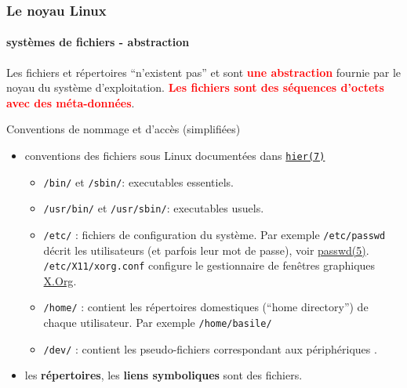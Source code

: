 \documentclass[xcolor=svgnames,final,smaller,a4]{beamer}
\begin{document}
\begin{frame}
  \frametitle{Le noyau Linux}
  \framesubtitle{systèmes de fichiers - abstraction}


  Les fichiers et répertoires ``n'existent pas'' et sont  \textbf{\textcolor{red}{une abstraction}} fournie par le noyau du système d'exploitation. \textbf{\textcolor{red}{Les fichiers sont des séquences d'octets}} {} \textbf{\textcolor{red}{avec des méta-données}}.

  Conventions de nommage et d'accès (simplifiées)

  \begin{itemize}

  \item conventions des fichiers sous Linux documentées dans \href{https://man7.org/linux/man-pages/man7/hier.7.html}{\texttt{hier(7)}} \begin{itemize}
  \item \texttt{/bin/} et \texttt{/sbin/}: executables essentiels.
  \item \texttt{/usr/bin/} et \texttt{/usr/sbin/}: executables usuels.
    \item \texttt{/etc/} : fichiers de configuration du système. Par
      exemple \texttt{/etc/passwd} décrit les utilisateurs (et parfois
      leur mot de passe), voir
      \href{https://man7.org/linux/man-pages/man5/passwd.5.html}{passwd(5)}. \texttt{/etc/X11/xorg.conf}
      configure le gestionnaire de fenêtres graphiques
      \href{https://fr.wikipedia.org/wiki/X.Org}{X.Org}.
      \item \texttt{/home/} : contient les répertoires domestiques (``home directory'') de chaque utilisateur. Par exemple \texttt{/home/basile/}
      \item \texttt{/dev/} : contient les pseudo-fichiers correspondant aux périphériques {}.
  \end{itemize}
    \item les \textbf{répertoires}, les  \textbf{liens symboliques} sont des fichiers.
  \end{itemize}

\end{frame}
  
\end{document}
